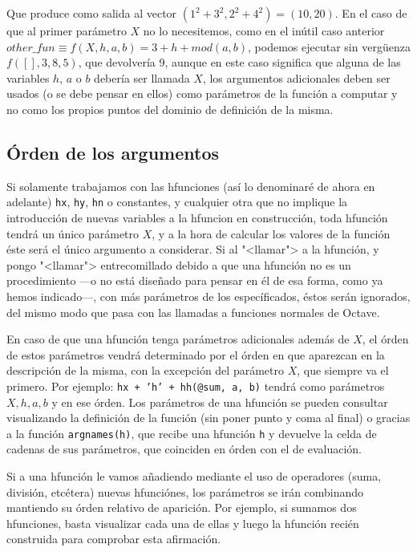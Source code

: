 \documentclass{article}
\begin{document}
Que produce como salida al vector $(1^2 + 3^2, 2^2 + 4^2) = (10,
20)$. En el caso de que al primer parámetro $X$ no lo necesitemos,
como en el inútil caso anterior $other\_fun \equiv f(X, h, a, b) = 3 +
h + mod(a, b)$, podemos ejecutar sin vergüenza $f([], 3, 8, 5)$, que
devolvería 9, aunque en este caso significa que alguna de las
variables $h$, $a$ o $b$ debería ser llamada $X$, los argumentos
adicionales deben ser usados (o se debe pensar en ellos) como
parámetros de la función a computar y no como los propios puntos del
dominio de definición de la misma.

\subsection{Órden de los argumentos}
\label{ssec:order}
Si solamente trabajamos con las hfunciones (así lo denominaré de ahora
en adelante) \texttt{hx}, \texttt{hy}, \texttt{hn} o constantes, y
cualquier otra que no implique la introducción de nuevas variables a
la hfuncion en construcción, toda hfunción tendrá un único parámetro
$X$, y a la hora de calcular los valores de la función éste será el
único argumento a considerar. Si al "<llamar"> a la hfunción, y pongo
"<llamar"> entrecomillado debido a que una hfunción no es un
procedimiento ---o no está diseñado para pensar en él de esa forma, como
ya hemos indicado---, con más parámetros de los específicados, éstos
serán ignorados, del mismo modo que pasa con las llamadas a funciones
normales de Octave.

En caso de que una hfunción tenga parámetros adicionales además de
$X$, el órden de estos parámetros vendrá determinado por el órden en
que aparezcan en la descripción de la misma, con la excepción del
parámetro $X$, que siempre va el primero. Por ejemplo: \texttt{hx +
  'h' + hh(@sum, a, b)} tendrá como parámetros $X, h, a, b$ y en ese
órden. Los parámetros de una hfunción se pueden consultar visualizando
la definición de la función (sin poner punto y coma al final) o
gracias a la función \texttt{argnames(h)}, que recibe una hfunción
\texttt{h} y devuelve la celda de cadenas de sus parámetros, que
coinciden en órden con el de evaluación.

Si a una hfunción le vamos añadiendo mediante el uso de operadores
(suma, división, etcétera) nuevas hfunciónes, los parámetros se irán
combinando mantiendo su órden relativo de aparición. Por ejemplo, si
sumamos dos hfunciones, basta visualizar cada una de ellas y luego la
hfunción recién construida para comprobar esta afirmación.
\end{document}
